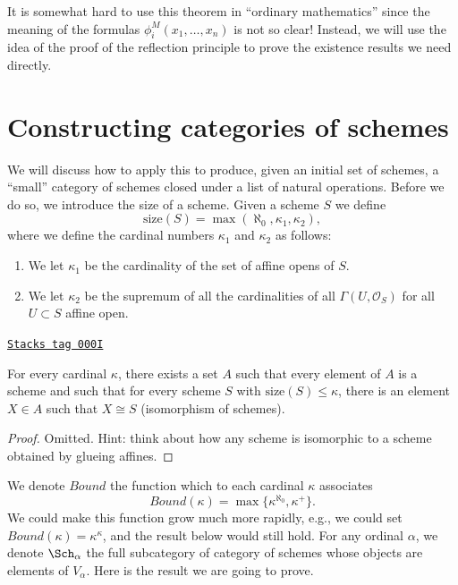 \medskip\noindent
It is somewhat hard to use this theorem in ``ordinary mathematics''
since the meaning of the formulas $\phi_i^M(x_1, \ldots, x_n)$
is not so clear! Instead, we will use the idea of the proof of the
reflection principle to prove the existence results we need directly.

\section{Constructing categories of schemes}
\label{sets-section-categories-schemes}
We will discuss how to apply this to produce, given an initial
set of schemes, a ``small'' category of schemes closed under
a list of natural operations. Before we do so, we introduce the
size of a scheme. Given a scheme $S$ we define
$$
\text{size}(S) = \max(\aleph_0, \kappa_1, \kappa_2),
$$
where we define the cardinal numbers $\kappa_1$ and $\kappa_2$ as follows:
\begin{enumerate}
\item We let $\kappa_1$ be the cardinality of the set of affine opens of $S$.
\item We let $\kappa_2$ be the supremum of all the cardinalities of
all $\Gamma(U, \mathcal{O}_S)$ for all $U \subset S$ affine open.
\end{enumerate}

\begin{lemma}
\label{sets-lemma-bounded-size}
\href{https://stacks.math.columbia.edu/tag/000I}{\texttt{Stacks tag 000I}}

For every cardinal $\kappa$, there exists a set $A$ such
that every element of $A$ is a scheme and such that for every
scheme $S$ with $\text{size}(S) \leq \kappa$, there is
an element $X \in A$ such that $X \cong S$ (isomorphism
of schemes).
\end{lemma}

\begin{proof}
Omitted. Hint: think about how any scheme is isomorphic to a scheme
obtained by glueing affines.
\end{proof}

We denote $Bound$ the function which to each
cardinal $\kappa$ associates
\begin{equation}
\label{equation-bound}
Bound(\kappa) = \max\{\kappa^{\aleph_0}, \kappa^+\}.
\end{equation}
We could make this function grow much more rapidly, e.g., we could
set $Bound(\kappa) = \kappa^\kappa$, and the result below would still hold.
For any ordinal $\alpha$, we denote $\Sch_\alpha$ the full
subcategory of category of schemes whose objects are elements of
$V_\alpha$. Here is the result we are going to prove.

